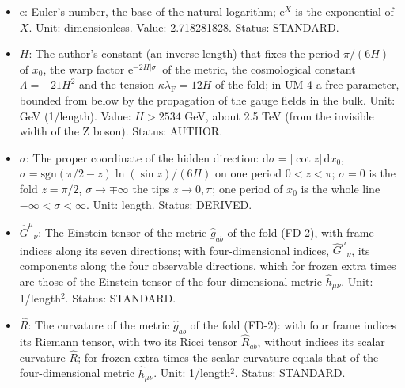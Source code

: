 \documentclass[
  10pt,
]{article}
\begin{document}
\begin{itemize}
  if the label \(X\) of a half of dirac16complex is L and 0 otherwise);
  with two index strings of equal length the generalised Kronecker delta
  \(\delta^{M_1M_2\cdots}_{N_1N_2\cdots}\), the determinant of the
  square matrix of the Kronecker deltas \(\delta^{M_a}_{N_b}\) (\(+1\)
  or \(-1\) if the upper indices are an even or odd permutation of the
  lower ones, 0 otherwise). Status: STANDARD.
\item
  \(\mathrm{e}\): Euler's number, the base of the natural logarithm;
  \(\mathrm{e}^{X}\) is the exponential of \(X\). Unit: dimensionless.
  Value: 2.718281828. Status: STANDARD.
\item
  \(H\): The author's constant (an inverse length) that fixes the period
  \(\pi/(6H)\) of \(x_0\), the warp factor
  \(\mathrm{e}^{-2H\lvert\sigma\rvert}\) of the metric, the cosmological
  constant \(\Lambda = -21H^2\) and the tension
  \(\kappa\lambda_{\mathrm{F}} = 12H\) of the fold; in UM-4 a free
  parameter, bounded from below by the propagation of the gauge fields
  in the bulk. Unit: GeV (1/length). Value: \(H > 2534\) GeV, about 2.5
  TeV (from the invisible width of the Z boson). Status: AUTHOR.
\item
  \(\sigma\): The proper coordinate of the hidden direction:
  \(\mathrm{d}\sigma = \lvert\cot z\rvert\,\mathrm{d}x_0\),
  \(\sigma = \mathrm{sgn}(\pi/2 - z)\ln(\sin z)/(6H)\) on one period
  \(0 < z < \pi\); \(\sigma = 0\) is the fold \(z = \pi/2\),
  \(\sigma \to \mp\infty\) the tips \(z \to 0, \pi\); one period of
  \(x_0\) is the whole line \(-\infty < \sigma < \infty\). Unit: length.
  Status: DERIVED.
\item
  \(\hat G^\mu{}_\nu\): The Einstein tensor of the metric
  \(\hat g_{ab}\) of the fold (FD-2), with frame indices along its seven
  directions; with four-dimensional indices, \(\hat G^\mu{}_\nu\), its
  components along the four observable directions, which for frozen
  extra times are those of the Einstein tensor of the four-dimensional
  metric \(\hat h_{\mu\nu}\). Unit: 1/length\(^2\). Status: STANDARD.
\item
  \(\hat R\): The curvature of the metric \(\hat g_{ab}\) of the fold
  (FD-2): with four frame indices its Riemann tensor, with two its Ricci
  tensor \(\hat R_{ab}\), without indices its scalar curvature
  \(\hat R\); for frozen extra times the scalar curvature equals that of
  the four-dimensional metric \(\hat h_{\mu\nu}\). Unit: 1/length\(^2\).
  Status: STANDARD.
\end{itemize}
\end{document}
